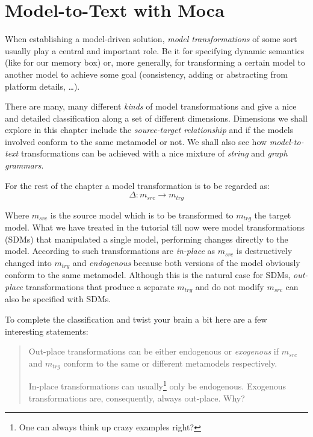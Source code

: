 \chapter{Model-to-Text with Moca}

When establishing a model-driven solution, \emph{model transformations} of some sort usually play a central and important role.
Be it for specifying dynamic semantics (like for our memory box) or, more generally, for transforming a certain model to another model to achieve some goal (consistency, adding or abstracting from platform details, \ldots).  

There are many, many different \emph{kinds} of model transformations and \cite{CH03,Mens_Gorp_2006} give a nice and detailed classification along a set of different dimensions. 
Dimensions we shall explore in this chapter include the \emph{source-target relationship} \cite{Mens_Gorp_2006} and if the models involved conform to the same metamodel or not.
We shall also see how \emph{model-to-text} transformations can be achieved with a nice mixture of \emph{string} and \emph{graph grammars}. 

For the rest of the chapter a model transformation is to be regarded as:
\begin{displaymath}
 	\Delta: m_{src} \rightarrow m_{trg}
\end{displaymath}

Where $m_{src}$ is the source model which is to be transformed to $m_{trg}$ the target model.
What we have treated in the tutorial till now were model transformations (SDMs) that manipulated a single model, performing changes directly to the model.
According to \cite{Mens_Gorp_2006} such transformations are \emph{in-place} as $m_{src}$ is destructively changed into $m_{trg}$ and \emph{endogenous} because both versions of the model obviously conform to the same metamodel.
Although this is the natural case for SDMs, \emph{out-place} transformations that produce a separate $m_{trg}$ and do not modify $m_{src}$ can also be specified with SDMs.

\clearpage
To complete the classification and twist your brain a bit here are a few interesting statements:
\begin{quote}
Out-place transformations can be either endogenous or \emph{exogenous} if $m_{src}$ and $m_{trg}$ conform to the same or different metamodels respectively.

In-place transformations can usually\footnote{One can always think up crazy examples right?} only be endogenous.  Exogenous transformations are, consequently, always out-place.  Why? 
\end{quote}  
  

